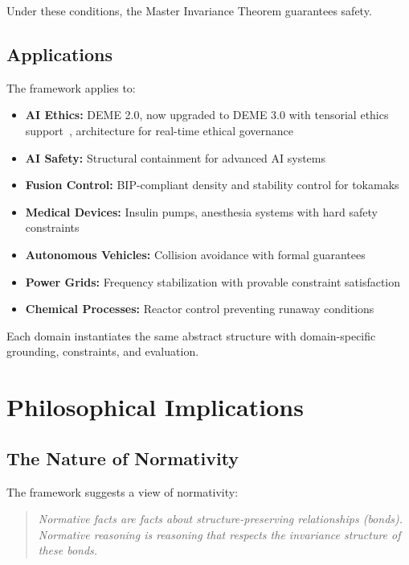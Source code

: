 \documentclass[12pt]{article}
\begin{document}
Under these conditions, the Master Invariance Theorem guarantees safety.

\subsection{Applications}

The framework applies to:

\begin{itemize}
    \item \textbf{AI Ethics:} DEME 2.0, now upgraded to DEME 3.0 with tensorial ethics support~\cite{bond2026erisml}, architecture for real-time ethical governance
    \item \textbf{AI Safety:} Structural containment for advanced AI systems
    \item \textbf{Fusion Control:} BIP-compliant density and stability control for tokamaks
    \item \textbf{Medical Devices:} Insulin pumps, anesthesia systems with hard safety constraints
    \item \textbf{Autonomous Vehicles:} Collision avoidance with formal guarantees
    \item \textbf{Power Grids:} Frequency stabilization with provable constraint satisfaction
    \item \textbf{Chemical Processes:} Reactor control preventing runaway conditions
\end{itemize}

Each domain instantiates the same abstract structure with domain-specific grounding, constraints, and evaluation.

\section{Philosophical Implications}

\subsection{The Nature of Normativity}

The framework suggests a view of normativity:

\begin{quote}
\textit{Normative facts are facts about structure-preserving relationships (bonds). Normative reasoning is reasoning that respects the invariance structure of these bonds.}
\end{quote}
\end{document}
